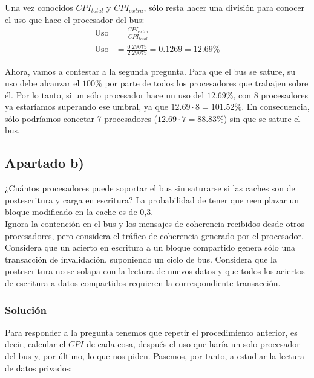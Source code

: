 \documentclass[12pt,a4paper]{article}
\begin{document}
Una vez conocidos $CPI_{total}$ y $CPI_{extra}$, sólo resta hacer una división para conocer el uso que hace el procesador del bus:
\begin{align*}
\text{Uso}&=\frac{CPI_{extra}}{CPI_{total}}\\
\text{Uso}&=\frac{0.29075}{2.29075} = 0.1269 = 12.69\%
\end{align*}

Ahora, vamos a contestar a la segunda pregunta. Para que el bus se sature, su uso debe alcanzar el $100\%$ por parte de todos los procesadores que trabajen sobre él. Por lo tanto, si un sólo procesador hace un uso del $12.69\%$, con 8 procesadores ya estaríamos superando ese umbral, ya que $12.69\cdot 8=101.52\%$. En consecuencia, sólo podríamos conectar 7 procesadores ($12.69\cdot 7=88.83\%$) sin que se sature el bus. 

\subsection{Apartado b)}
¿Cuántos procesadores puede soportar el bus sin saturarse si las caches son de postescritura y carga en escritura? La probabilidad de tener que reemplazar un bloque modificado en la cache es de 0,3. \\

Ignora la contención en el bus y los mensajes de coherencia recibidos desde otros procesadores, pero considera el tráfico de coherencia generado por el procesador. Considera que un acierto en escritura a un bloque compartido genera sólo una transacción de invalidación, suponiendo un ciclo de bus. Considera que la postescritura no se solapa con la lectura de nuevos datos y que todos los aciertos de escritura a datos compartidos requieren la correspondiente transacción.

\subsubsection{Solución}

Para responder a la pregunta tenemos que repetir el procedimiento anterior, es decir, calcular el $CPI$ de cada cosa, después el uso que haría un solo procesador del bus y, por último, lo que nos piden. Pasemos, por tanto, a estudiar la lectura de datos privados:
\end{document}
